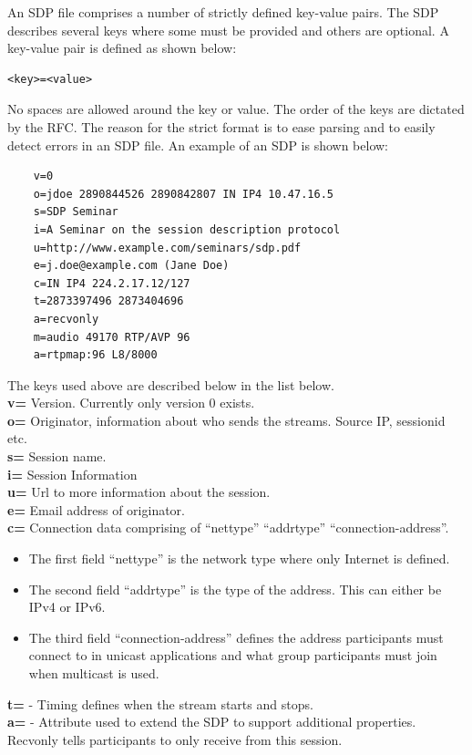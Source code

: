 An SDP file comprises a number of strictly defined key-value pairs.
The SDP describes several keys where some must be provided and others are optional.
A key-value pair is defined as shown below:
\begin{verbatim}
<key>=<value>
\end{verbatim}

No spaces are allowed around the key or value.
The order of the keys are dictated by the RFC. The reason for the strict format is to ease parsing and to easily detect errors in an SDP file. An example of an SDP is shown below:

\begin{verbatim}
    v=0
    o=jdoe 2890844526 2890842807 IN IP4 10.47.16.5
    s=SDP Seminar
    i=A Seminar on the session description protocol
    u=http://www.example.com/seminars/sdp.pdf
    e=j.doe@example.com (Jane Doe)
    c=IN IP4 224.2.17.12/127
    t=2873397496 2873404696
    a=recvonly
    m=audio 49170 RTP/AVP 96
    a=rtpmap:96 L8/8000
\end{verbatim}
The keys used above are described below in the list below. \\
\textbf{v=} Version. Currently only version 0 exists. \\
\textbf{o=} Originator, information about who sends the streams. Source IP, sessionid etc. \\
\textbf{s=} Session name. \\
\textbf{i=} Session Information \\
\textbf{u=} Url to more information about the session.\\
\textbf{e=} Email address of originator.\\
\textbf{c=} Connection data comprising of ``nettype'' ``addrtype'' ``connection-address''.
\begin{itemize}
	\item The first field ``nettype'' is the network type where only Internet is defined. 
	\item The second field ``addrtype'' is the type of the address. This can either be IPv4 or IPv6.
	\item The third field ``connection-address'' defines the address participants must connect to in unicast applications and what group participants must join when multicast is used.
\end{itemize}
\textbf{t=} - Timing defines when the stream starts and stops. \\
\textbf{a=} - Attribute used to extend the SDP to support additional properties. Recvonly tells participants to only receive from this session. \\
